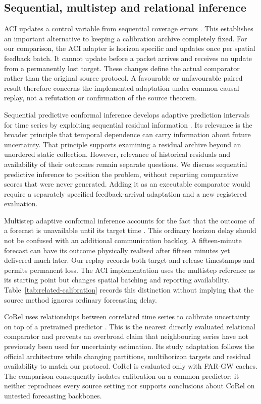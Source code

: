 \subsection{Sequential, multistep and relational inference}
ACI updates a control variable from sequential coverage errors \citep{gibbs2021}. This establishes an important alternative to keeping a calibration archive completely fixed. For our comparison, the ACI adapter is horizon specific and updates once per spatial feedback batch. It cannot update before a packet arrives and receives no update from a permanently lost target. These changes define the actual comparator rather than the original source protocol. A favourable or unfavourable paired result therefore concerns the implemented adaptation under common causal replay, not a refutation or confirmation of the source theorem.

Sequential predictive conformal inference develops adaptive prediction intervals for time series by exploiting sequential residual information \citep{xu2023}. Its relevance is the broader principle that temporal dependence can carry information about future uncertainty. That principle supports examining a residual archive beyond an unordered static collection. However, relevance of historical residuals and availability of their outcomes remain separate questions. We discuss sequential predictive inference to position the problem, without reporting comparative scores that were never generated. Adding it as an executable comparator would require a separately specified feedback-arrival adaptation and a new registered evaluation.

Multistep adaptive conformal inference accounts for the fact that the outcome of a forecast is unavailable until its target time \citep{hallberg2024}. This ordinary horizon delay should not be confused with an additional communication backlog. A fifteen-minute forecast can have its outcome physically realised after fifteen minutes yet delivered much later. Our replay records both target and release timestamps and permits permanent loss. The ACI implementation uses the multistep reference as its starting point but changes spatial batching and reporting availability. Table~\ref{tab:related-calibration} records this distinction without implying that the source method ignores ordinary forecasting delay.

CoRel uses relationships between correlated time series to calibrate uncertainty on top of a pretrained predictor \citep{cini2025}. This is the nearest directly evaluated relational comparator and prevents an overbroad claim that neighbouring series have not previously been used for uncertainty estimation. Its study adaptation follows the official architecture while changing partitions, multihorizon targets and residual availability to match our protocol. CoRel is evaluated only with FAR-GW caches. The comparison consequently isolates calibration on a common predictor; it neither reproduces every source setting nor supports conclusions about CoRel on untested forecasting backbones.

